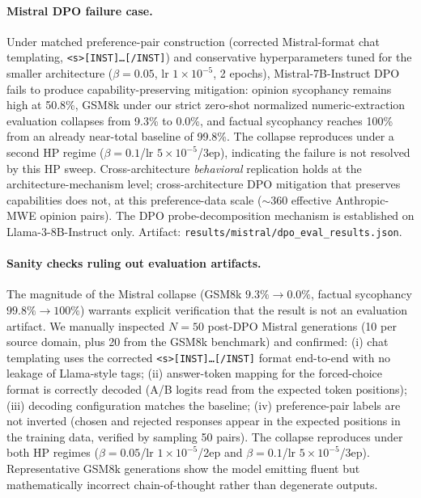 \documentclass{article}
\begin{document}
\paragraph{Mistral DPO failure case.} Under matched preference-pair construction (corrected Mistral-format chat templating, \texttt{<s>[INST]\ldots[/INST]}) and conservative hyperparameters tuned for the smaller architecture ($\beta{=}0.05$, lr $1\times10^{-5}$, 2 epochs), Mistral-7B-Instruct DPO fails to produce capability-preserving mitigation: opinion sycophancy remains high at 50.8\%, GSM8k under our strict zero-shot normalized numeric-extraction evaluation collapses from 9.3\% to 0.0\%, and factual sycophancy reaches 100\% from an already near-total baseline of 99.8\%. The collapse reproduces under a second HP regime ($\beta{=}0.1$/lr $5{\times}10^{-5}$/3ep), indicating the failure is not resolved by this HP sweep. Cross-architecture \emph{behavioral} replication holds at the architecture-mechanism level; cross-architecture DPO mitigation that preserves capabilities does not, at this preference-data scale ($\sim$360 effective Anthropic-MWE opinion pairs). The DPO probe-decomposition mechanism is established on Llama-3-8B-Instruct only. Artifact: \texttt{results/mistral/dpo\_eval\_results.json}.

\paragraph{Sanity checks ruling out evaluation artifacts.} The magnitude of the Mistral collapse (GSM8k $9.3\% \to 0.0\%$, factual sycophancy $99.8\% \to 100\%$) warrants explicit verification that the result is not an evaluation artifact. We manually inspected $N{=}50$ post-DPO Mistral generations (10 per source domain, plus 20 from the GSM8k benchmark) and confirmed: (i) chat templating uses the corrected \texttt{<s>[INST]\ldots[/INST]} format end-to-end with no leakage of Llama-style tags; (ii) answer-token mapping for the forced-choice format is correctly decoded (A/B logits read from the expected token positions); (iii) decoding configuration matches the baseline; (iv) preference-pair labels are not inverted (chosen and rejected responses appear in the expected positions in the training data, verified by sampling 50 pairs). The collapse reproduces under both HP regimes ($\beta{=}0.05$/lr $1{\times}10^{-5}$/2ep and $\beta{=}0.1$/lr $5{\times}10^{-5}$/3ep). Representative GSM8k generations show the model emitting fluent but mathematically incorrect chain-of-thought rather than degenerate outputs.
\end{document}
